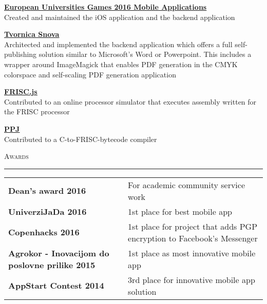 \documentclass[10pt, a4paper, final, onecolumn, oneside, notitlepage]{article}
\newcommand{\sectionspacing}[0]{ \vspace{10pt} } %
\newcommand{\sectionrule}[0]{ \rule[6pt]{\textwidth}{0.5pt} } %
\renewcommand{\section}[1]{\sectionspacing {\large \scshape #1} \sectionrule}
\begin{document}
\begin{center}
\begin{flushleft}
\textbf{\href{https://itunes.apple.com/us/app/eug-2016/id1126963997?mt=8}{\underline{European Universities Games 2016 Mobile Applications}}} \\
Created and maintained the iOS application and the backend application \\
\vspace{2mm}

\textbf{\href{https://tvornica-snova.hr}{\underline{Tvornica Snova}}} \\
Architected and implemented the backend application which offers a full
self-publishing solution similar to Microsoft's Word or Powerpoint.
This includes a wrapper around ImageMagick that enables PDF generation in the
CMYK colorspace and self-scaling PDF generation application \\
\vspace{2mm}

\textbf{\href{https://github.com/izuzak/FRISCjs}{\underline{FRISC.js}}} \\
Contributed to an online processor simulator that executes assembly written for
the FRISC processor \\
\vspace{2mm}

\textbf{\href{https://github.com/Stankec/PPJ}{\underline{PPJ}}} \\
Contributed to a C-to-FRISC-bytecode compiler \\
\end{flushleft}


\section{Awards}
\begin{tabular}{ >{\hfill}p{} p{} }
\textbf{Dean's award 2016} & For academic community service work \\
\textbf{UniverziJaDa 2016} & 1st place for best mobile app \\
\textbf{Copenhacks 2016} & 1st place for project that adds PGP encryption to
Facebook's Messenger \\
\textbf{Agrokor - Inovacijom do poslovne prilike 2015} & 1st place as most
innovative mobile app \\
\textbf{AppStart Contest 2014} & 3rd place for innovative mobile app solution \\
\end{tabular}



\end{center}
\end{document}
